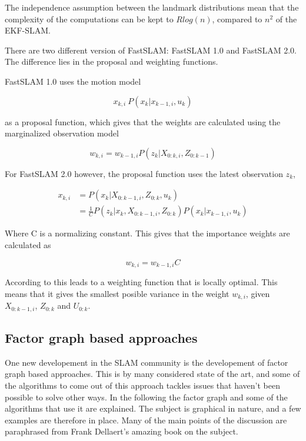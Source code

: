 The independence assumption between the landmark distributions mean that the complexity of the computations can be kept to $Rlog(n)$, compared to $n^2$ of the EKF-SLAM. 

There are two different version of FastSLAM: FastSLAM 1.0\cite{FastSLAM1} and FastSLAM 2.0\cite{FastSLAM2}. The difference lies in the proposal and weighting functions. 

FastSLAM 1.0 uses the motion model 

\begin{equation}
    x_{k,i} ~ P(x_k|x_{k-1,i},u_k)
\end{equation}

as a proposal function, which gives that the weights are calculated using the marginalized observation model

\begin{equation}
    w_{k,i} = w_{k-1,i}P(z_k|X_{0:k,i},Z_{0:k-1})
\end{equation}

For FastSLAM 2.0 however, the proposal function uses the latest observation $z_k$,

\begin{align}
    x_{k,i} &= P(x_k|X_{0:k-1,i},Z_{0:k},u_k) \\
    &= \frac{1}{C}P(z_k|x_k,X_{0:k-1,i},Z_{0:k})P(x_k|x_{k-1,i},u_k)
\end{align}

Where C is a normalizing constant. This gives that the importance weights are calculated as

\begin{equation}
    w_{k,i} = w_{k-1,i}C
\end{equation}

According to \cite{SLAMIntro} this leads to a weighting function that is locally optimal. This means that it gives the smallest posible variance in the weight $w_{k,i}$, given $X_{0:k-1,i}$, $Z_{0:k}$ and $U_{0:k}$.

\subsection{Factor graph based approaches}

One new developement in the SLAM community is the developement of factor graph based approaches. This is by many considered state of the art, and some of the algorithms to come out of this approach tackles issues that haven't been possible to solve other ways. In the following the factor graph and some of the algorithms that use it are explained. The subject is graphical in nature, and a few examples are therefore in place. Many of the main points of the discussion are paraphrased from Frank Dellaert's amazing book on the subject\cite{Dellaert}.

